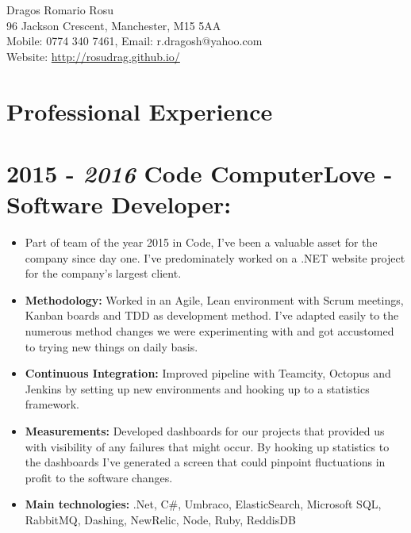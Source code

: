 \documentclass[12pt,a4paper]{res}
\begin{document}
\thispagestyle{empty}
  \begin{center}
  \Large{Dragos Romario Rosu  \\ [12pt]}
  \normalsize 96 Jackson Crescent, Manchester, M15 5AA\\
  Mobile: 0774 340 7461, Email: r.dragosh@yahoo.com\\
  Website: \url{http://rosudrag.github.io/}
  \end{center}
  
\begin{resume}
\vspace{-10mm}
\section{\large\bf Professional Experience}

\section{\bf 2015 - \textit{2016} \hspace{0.3mm} Code ComputerLove - Software Developer:}
\vspace{5mm}    
	\begin{itemize}
	\item[] Part of team of the year 2015 in Code, I've been a valuable asset for the company since day one. I've predominately worked on a .NET website project for the company's largest client.
	\item \textbf{Methodology:} Worked in an Agile, Lean environment with Scrum meetings, Kanban boards and TDD as development method. I've adapted easily to the numerous method changes we were experimenting with and got accustomed to trying new things on daily basis.
	\item \textbf{Continuous Integration:} Improved pipeline with Teamcity, Octopus and Jenkins by setting up new environments and hooking up to a statistics framework.
	\item \textbf{Measurements:} Developed dashboards for our projects that provided us with visibility of any failures that might occur. By hooking up statistics to the dashboards I've generated a screen that could pinpoint fluctuations in profit to the software changes.
	\item \textbf{Main technologies:} .Net, C\#, Umbraco, ElasticSearch, Microsoft SQL, RabbitMQ, Dashing, NewRelic, Node, Ruby, ReddisDB
	\end{itemize}
	

\end{resume}
\end{document}
